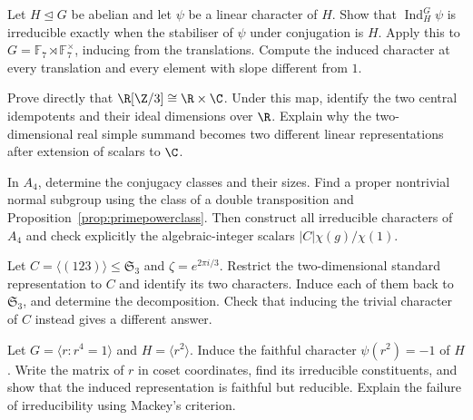 \begin{exercise}[$\star\star$]\label{ex:v10new-ch09-normalinduction}
Let $H\trianglelefteq G$ be abelian and let $\psi$ be a linear character of $H$. Show that $\operatorname{Ind}_H^G\psi$ is irreducible exactly when the stabiliser of $\psi$ under conjugation is $H$. Apply this to $G=\mathbb F_7\rtimes\mathbb F_7^\times$, inducing from the translations. Compute the induced character at every translation and every element with slope different from $1$.
\end{exercise}

\begin{exercise}[$\star\star$]\label{ex:v10new-ch09-c3real}
Prove directly that $\R[\Z/3]\cong\R\times\C$. Under this map, identify the two central idempotents and their ideal dimensions over $\R$. Explain why the two-dimensional real simple summand becomes two different linear representations after extension of scalars to $\C$.
\end{exercise}

\begin{exercise}[$\star\star\star$]\label{ex:v10new-ch09-primeclass}
In $A_4$, determine the conjugacy classes and their sizes. Find a proper nontrivial normal subgroup using the class of a double transposition and Proposition~\ref{prop:primepowerclass}. Then construct all irreducible characters of $A_4$ and check explicitly the algebraic-integer scalars $|C|\chi(g)/\chi(1)$.
\end{exercise}

\begin{exercise}[$\star$]\label{ex:v10exp-ch09-restriction}
Let $C=\langle(123)\rangle\le\mathfrak S_3$ and $\zeta=e^{2\pi i/3}$. Restrict the two-dimensional standard representation to $C$ and identify its two characters. Induce each of them back to $\mathfrak S_3$, and determine the decomposition. Check that inducing the trivial character of $C$ instead gives a different answer.
\end{exercise}

\begin{exercise}[$\star\star$]\label{ex:v10exp-ch09-faithfulind}
Let $G=\langle r:r^4=1\rangle$ and $H=\langle r^2\rangle$. Induce the faithful character $\psi(r^2)=-1$ of $H$. Write the matrix of $r$ in coset coordinates, find its irreducible constituents, and show that the induced representation is faithful but reducible. Explain the failure of irreducibility using Mackey's criterion.
\end{exercise}

